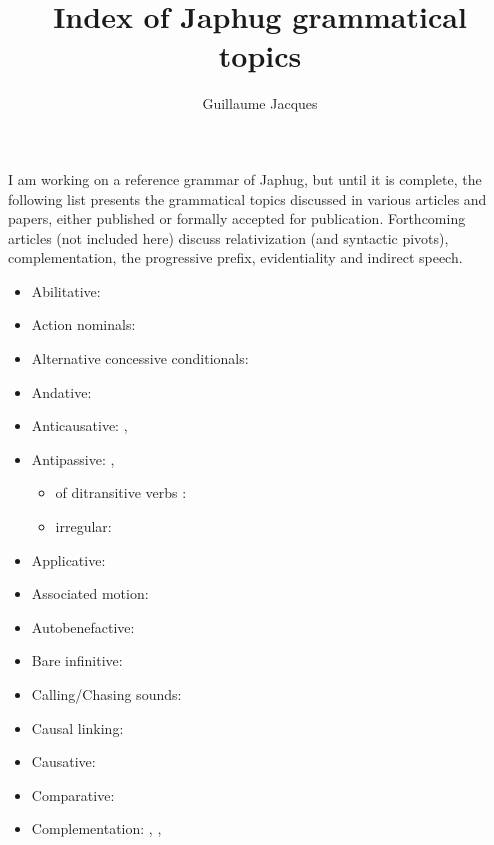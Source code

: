 \documentclass[oldfontcommands,oneside,a4paper,11pt]{article}
\begin{document}
 
\title{Index of Japhug grammatical topics}
\author{Guillaume Jacques}
\maketitle

I am working on a reference grammar of Japhug, but until it is complete, the following list presents the grammatical topics discussed in various articles and papers, either published or formally accepted for publication. Forthcoming articles (not included here) discuss relativization (and syntactic pivots), complementation, the progressive prefix, evidentiality and indirect speech.

\begin{itemize}
\item Abilitative: \citet{jacques15causative}
\item Action nominals: \citet[7]{jacques14antipassive}
\item Alternative concessive conditionals: \citet[298]{jacques14linking}
\item Andative: \citet[200-6]{jacques13harmonization}
\item Anticausative: \citet[213-4]{jacques12demotion}, \citet{jacques15spontaneous}
\item Antipassive: \citet[215-6]{jacques12demotion}, \citet{jacques14antipassive}
\begin{itemize}
\item of ditransitive verbs : \citet[13-4]{jacques14antipassive}
\item irregular:  \citet[18-20]{jacques14antipassive}
\end{itemize}
\item Applicative: \citet{jacques13tropative}
\item Associated motion: \citet[200-6]{jacques13harmonization}
\item Autobenefactive: \citet{jacques15spontaneous}
\item Bare infinitive: \citet[9]{jacques14antipassive}
\item Calling/Chasing sounds:   \citet[283-4]{japhug14ideophones}
\item Causal linking:  \citet[303-6]{jacques14linking}
\item Causative: \citet{jacques15causative}
\item Comparative: \citet{jacques15comparative}
\item Complementation: \citet{jacques08}, , \citet{jacques16sketch}
\begin{itemize}

\end{itemize}
\end{itemize}
\end{document}
